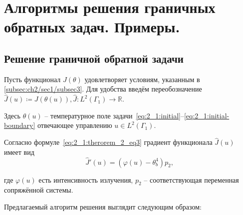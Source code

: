 \section{Алгоритмы решения граничных обратных задач. Примеры.}\label{sec:ch4/sec3}


\subsection{Решение граничной обратной задачи}
\label{subsec:ch4/sec3/boundary}

Пусть функционал $J(\theta)$ удовлетворяет условиям,
указанным в \autoref{subsec:ch2/sec1/subsec3}.
Для удобства введём переобозначение
$\hat{J}(u)\coloneqq J(\theta(u)), \hat{J}:L^2(\Gamma_1) \to \mathbb{R}$.

Здесь $\theta(u)$ -- температурное поле
задачи~\eqref{eq:2_1:initial}--\eqref{eq:2_1:initial-boundary}
отвечающее управлению $u \in L^2(\Gamma_1)$.

Согласно формуле~\eqref{eq:2_1:therorem_2_eq3}
градиент функционала $\hat{J}(u)$~\cite{Grenkin2016a} имеет вид
\[
    \hat{J}'(u)= (\varphi(u) -\theta_b^4)p_2,
\]

где $\varphi(u)$ есть интенсивность излучения,
$p_2$ -- соответствующая переменная сопряжённой системы.

Предлагаемый алгоритм решения выглядит следующим образом:


